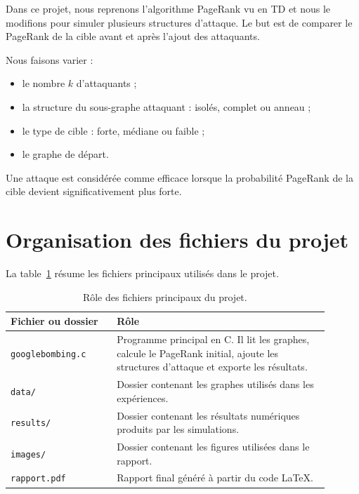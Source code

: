 \documentclass[12pt,a4paper]{article}
\theoremstyle{definition}
\begin{document}
Dans ce projet, nous reprenons l'algorithme PageRank vu en TD et nous le
modifions pour simuler plusieurs structures d'attaque. Le but est de comparer le
PageRank de la cible avant et après l'ajout des attaquants.

Nous faisons varier :
\begin{itemize}[noitemsep]
    \item le nombre $k$ d'attaquants ;
    \item la structure du sous-graphe attaquant : isolés, complet ou anneau ;
    \item le type de cible : forte, médiane ou faible ;
    \item le graphe de départ.
\end{itemize}

Une attaque est considérée comme efficace lorsque la probabilité PageRank de la
cible devient significativement plus forte.

\section{Organisation des fichiers du projet}

La table~\ref{tab:files} résume les fichiers principaux utilisés dans le projet.

\begin{table}[H]
\centering
\caption{Rôle des fichiers principaux du projet.}
\label{tab:files}
\begin{tabular}{p{0.30\linewidth}p{0.60\linewidth}}
\toprule
\textbf{Fichier ou dossier} & \textbf{Rôle} \\
\midrule
\texttt{googlebombing.c} &
Programme principal en C. Il lit les graphes, calcule le PageRank initial,
ajoute les structures d'attaque et exporte les résultats. \\
\texttt{data/} &
Dossier contenant les graphes utilisés dans les expériences. \\
\texttt{results/} &
Dossier contenant les résultats numériques produits par les simulations. \\
\texttt{images/} &
Dossier contenant les figures utilisées dans le rapport. \\
\texttt{rapport.pdf} &
Rapport final généré à partir du code \LaTeX. \\
\bottomrule
\end{tabular}
\end{table}
\end{document}
